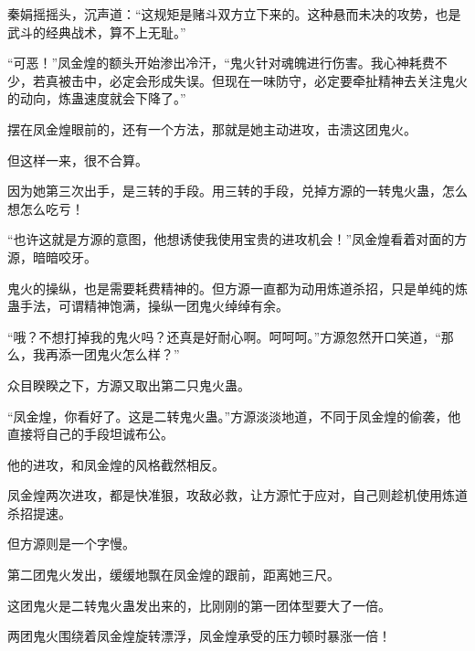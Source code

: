 \begin{this_body}
秦娟摇摇头，沉声道：“这规矩是赌斗双方立下来的。这种悬而未决的攻势，也是武斗的经典战术，算不上无耻。”

“可恶！”凤金煌的额头开始渗出冷汗，“鬼火针对魂魄进行伤害。我心神耗费不少，若真被击中，必定会形成失误。但现在一味防守，必定要牵扯精神去关注鬼火的动向，炼蛊速度就会下降了。”

摆在凤金煌眼前的，还有一个方法，那就是她主动进攻，击溃这团鬼火。

但这样一来，很不合算。

因为她第三次出手，是三转的手段。用三转的手段，兑掉方源的一转鬼火蛊，怎么想怎么吃亏！

“也许这就是方源的意图，他想诱使我使用宝贵的进攻机会！”凤金煌看着对面的方源，暗暗咬牙。

鬼火的操纵，也是需要耗费精神的。但方源一直都为动用炼道杀招，只是单纯的炼蛊手法，可谓精神饱满，操纵一团鬼火绰绰有余。

“哦？不想打掉我的鬼火吗？还真是好耐心啊。呵呵呵。”方源忽然开口笑道，“那么，我再添一团鬼火怎么样？”

众目睽睽之下，方源又取出第二只鬼火蛊。

“凤金煌，你看好了。这是二转鬼火蛊。”方源淡淡地道，不同于凤金煌的偷袭，他直接将自己的手段坦诚布公。

他的进攻，和凤金煌的风格截然相反。

凤金煌两次进攻，都是快准狠，攻敌必救，让方源忙于应对，自己则趁机使用炼道杀招提速。

但方源则是一个字慢。

第二团鬼火发出，缓缓地飘在凤金煌的跟前，距离她三尺。

这团鬼火是二转鬼火蛊发出来的，比刚刚的第一团体型要大了一倍。

两团鬼火围绕着凤金煌旋转漂浮，凤金煌承受的压力顿时暴涨一倍！

\end{this_body}

